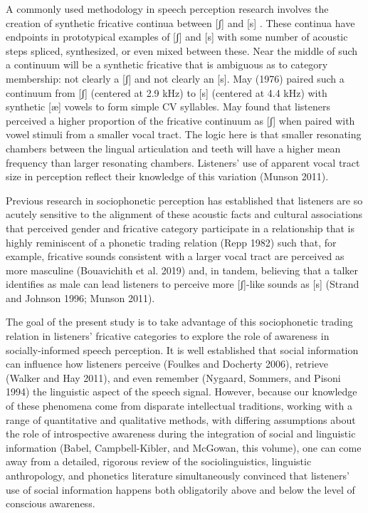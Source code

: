 \documentclass[
  letterpaper,
  DIV=11,
  numbers=noendperiod]{scrartcl}
\begin{document}
A commonly used methodology in speech perception research involves the
creation of synthetic fricative continua between {[}ʃ{]} and {[}s{]} .
These continua have endpoints in prototypical examples of {[}ʃ{]} and
{[}s{]} with some number of acoustic steps spliced, synthesized, or even
mixed between these. Near the middle of such a continuum will be a
synthetic fricative that is ambiguous as to category membership: not
clearly a {[}ʃ{]} and not clearly an {[}s{]}. May (1976) paired such a
continuum from {[}ʃ{]} (centered at 2.9 kHz) to {[}s{]} (centered at 4.4
kHz) with synthetic {[}æ{]} vowels to form simple CV syllables. May
found that listeners perceived a higher proportion of the fricative
continuum as {[}ʃ{]} when paired with vowel stimuli from a smaller vocal
tract. The logic here is that smaller resonating chambers between the
lingual articulation and teeth will have a higher mean frequency than
larger resonating chambers. Listeners' use of apparent vocal tract size
in perception reflect their knowledge of this variation (Munson 2011).

Previous research in sociophonetic perception has established that
listeners are so acutely sensitive to the alignment of these acoustic
facts and cultural associations that perceived gender and fricative
category participate in a relationship that is highly reminiscent of a
phonetic trading relation (Repp 1982) such that, for example, fricative
sounds consistent with a larger vocal tract are perceived as more
masculine (Bouavichith et al. 2019) and, in tandem, believing that a
talker identifies as male can lead listeners to perceive more
{[}ʃ{]}-like sounds as {[}s{]} (Strand and Johnson 1996; Munson 2011).

The goal of the present study is to take advantage of this sociophonetic
trading relation in listeners' fricative categories to explore the role
of awareness in socially-informed speech perception. It is well
established that social information can influence how listeners perceive
(Foulkes and Docherty 2006), retrieve (Walker and Hay 2011), and even
remember (Nygaard, Sommers, and Pisoni 1994) the linguistic aspect of
the speech signal. However, because our knowledge of these phenomena
come from disparate intellectual traditions, working with a range of
quantitative and qualitative methods, with differing assumptions about
the role of introspective awareness during the integration of social and
linguistic information (Babel, Campbell-Kibler, and McGowan, this
volume), one can come away from a detailed, rigorous review of the
sociolinguistics, linguistic anthropology, and phonetics literature
simultaneously convinced that listeners' use of social information
happens both obligatorily above and below the level of conscious
awareness.
\end{document}
